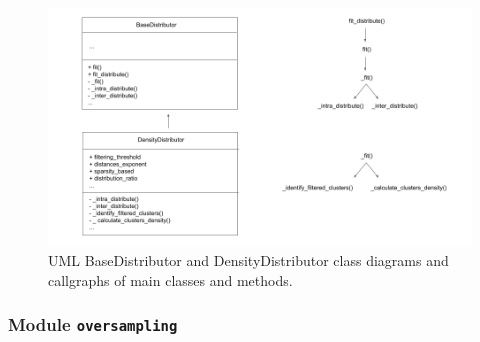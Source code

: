 \documentclass[preprint,12pt, a4paper]{elsarticle}
\begin{document}
\begin{figure}[H]
	\centering
	\includegraphics[width=1\linewidth]{../analysis/distributor_class_diagram}
	\caption{UML BaseDistributor and DensityDistributor class diagrams and callgraphs of main classes and methods.}
	\label{fig:distributor_class_diagram}
\end{figure}

\subsubsection{Module \texttt{oversampling}}
\label{oversampling}
\end{document}
